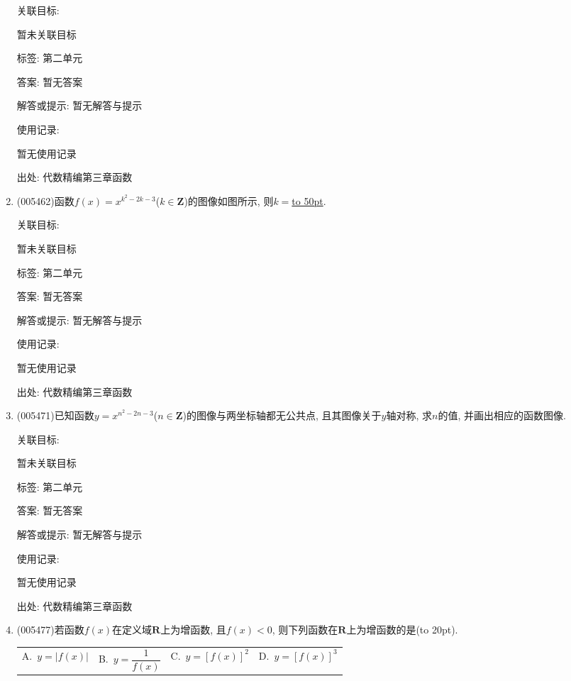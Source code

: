 \documentclass[10pt,a4paper]{article}
\newcommand{\blank}[1]{\underline{\hbox to #1pt{}}}
\newcommand{\bracket}[1]{(\hbox to #1pt{})}
\newcommand{\fourch}[4]{\par\begin{tabular}{p{.23\textwidth}p{.23\textwidth}p{.23\textwidth}p{.23\textwidth}}
A.~#1 &B.~#2& C.~#3& D.~#4
\end{tabular}}
\begin{document}
\begin{enumerate}[1.]
关联目标:

暂未关联目标



标签: 第二单元

答案: 暂无答案

解答或提示: 暂无解答与提示

使用记录:

暂无使用记录


出处: 代数精编第三章函数
\item { (005462)}函数$f(x)=x^{k^2-2k-3}$($k\in \mathbf{Z}$)的图像如图所示, 则$k=$\blank{50}.
\begin{center}
\end{center}


关联目标:

暂未关联目标



标签: 第二单元

答案: 暂无答案

解答或提示: 暂无解答与提示

使用记录:

暂无使用记录


出处: 代数精编第三章函数
\item { (005471)}已知函数$y=x^{n^2-2n-3}$($n\in \mathbf{Z}$)的图像与两坐标轴都无公共点, 且其图像关于$y$轴对称, 求$n$的值, 并画出相应的函数图像.


关联目标:

暂未关联目标



标签: 第二单元

答案: 暂无答案

解答或提示: 暂无解答与提示

使用记录:

暂无使用记录


出处: 代数精编第三章函数
\item { (005477)}若函数$f(x)$在定义域$\mathbf{R}$上为增函数, 且$f(x)<0$, 则下列函数在$\mathbf{R}$上为增函数的是\bracket{20}.
\fourch{$y=|f(x)|$}{$y=\dfrac 1{f(x)}$}{$y=[ f(x) ]^2$}{$y=[ f(x) ]^3$}



\end{enumerate}
\end{document}

